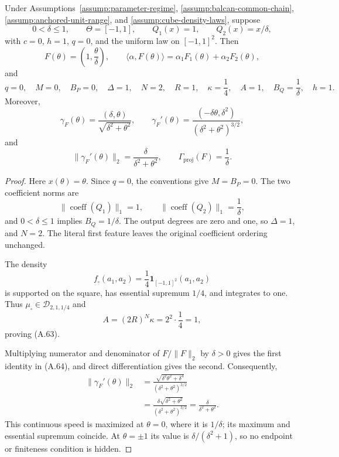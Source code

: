 \begin{proposition}
\label{prop:counter-presentation}
Under Assumptions~\ref{assump:parameter-regime},
\ref{assump:balcan-common-chain},
\ref{assump:anchored-unit-range}, and
\ref{assump:cube-density-laws}, suppose
\[
0<\delta\leq1,
\qquad
\Theta=[-1,1],
\qquad
Q_1(x)=1,
\qquad
Q_2(x)=x/\delta,
\]
with $c=0$, $h=1$, $q=0$, and the uniform law on $[-1,1]^2$.  Then
\[
F(\theta)=\left(1,\frac{\theta}{\delta}\right),
\qquad
\langle\alpha,F(\theta)\rangle
=\alpha_1F_1(\theta)+\alpha_2F_2(\theta),
\]
and
\[
q=0,
\quad M=0,
\quad B_P=0,
\quad \Delta=1,
\quad N=2,
\quad R=1,
\quad \kappa=\frac14,
\quad A=1,
\quad B_Q=\frac1\delta,
\quad h=1.
\tag{A.63}
\]
Moreover,
\[
\gamma_F(\theta)
=\frac{(\delta,\theta)}{\sqrt{\delta^2+\theta^2}},
\qquad
\gamma_F'(\theta)
=\frac{(-\delta\theta,\delta^2)}
       {(\delta^2+\theta^2)^{3/2}},
\tag{A.64}
\]
and
\[
\|\gamma_F'(\theta)\|_2
=\frac{\delta}{\delta^2+\theta^2},
\qquad
\Gamma_{\mathrm{proj}}(F)=\frac1\delta.
\tag{A.65}
\]
\end{proposition}

\begin{proof}
Here $x(\theta)=\theta$.  Since $q=0$, the conventions give
$M=B_P=0$.  The two coefficient norms are
\[
\|\operatorname{coeff}(Q_1)\|_1=1,
\qquad
\|\operatorname{coeff}(Q_2)\|_1=\frac1\delta,
\]
and $0<\delta\leq1$ implies $B_Q=1/\delta$.  The output degrees are zero
and one, so $\Delta=1$, and $N=2$.  The literal first feature leaves the
original coefficient ordering unchanged.

The density
\[
f_\square(a_1,a_2)
=\frac14\mathbf1_{[-1,1]^2}(a_1,a_2)
\]
is supported on the square, has essential supremum $1/4$, and integrates to
one.  Thus $\mu_\square\in\mathcal D_{2,1,1/4}$ and
\[
A=(2R)^N\kappa=2^2\cdot\frac14=1,
\]
proving (A.63).

Multiplying numerator and denominator of $F/\|F\|_2$ by $\delta>0$ gives
the first identity in (A.64), and direct differentiation gives the second.
Consequently,
\[
\begin{aligned}
\|\gamma_F'(\theta)\|_2
&=\frac{\sqrt{\delta^2\theta^2+\delta^4}}
        {(\delta^2+\theta^2)^{3/2}}\\
&=\frac{\delta\sqrt{\delta^2+\theta^2}}
        {(\delta^2+\theta^2)^{3/2}}
=\frac{\delta}{\delta^2+\theta^2}.
\end{aligned}
\]
This continuous speed is maximized at $\theta=0$, where it is $1/\delta$;
its maximum and essential supremum coincide.  At $\theta=\pm1$ its value is
$\delta/(\delta^2+1)$, so no endpoint or finiteness condition is hidden.
\end{proof}

